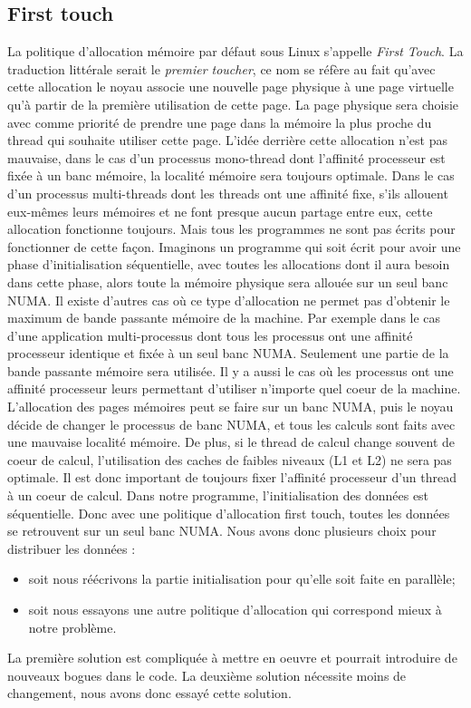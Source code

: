 \subsection{First touch}
La politique d'allocation mémoire par défaut sous Linux s'appelle {\em First Touch}.
%
La traduction littérale serait le {\em premier toucher}, ce nom se réfère au fait qu'avec cette allocation le noyau associe une nouvelle page physique à une page virtuelle qu'à partir de la première utilisation de cette page.
%
La page physique sera choisie avec comme priorité de prendre une page dans la mémoire la plus proche du thread qui souhaite utiliser cette page.
%
L'idée derrière cette allocation n'est pas mauvaise, dans le cas d'un processus mono-thread dont l'affinité processeur est fixée à un banc mémoire, la localité mémoire sera toujours optimale.
%
Dans le cas d'un processus multi-threads dont les threads ont une affinité fixe, s'ils allouent eux-mêmes leurs mémoires et ne font presque aucun partage entre eux, cette allocation fonctionne toujours.
%
Mais tous les programmes ne sont pas écrits pour fonctionner de cette façon.
%
Imaginons un programme qui soit écrit pour avoir une phase d'initialisation séquentielle, avec toutes les allocations dont il aura besoin dans cette phase, alors toute la mémoire physique sera allouée sur un seul banc NUMA.
%
Il existe d'autres cas où ce type d'allocation ne permet pas d'obtenir le maximum de bande passante mémoire de la machine.
%
Par exemple dans le cas d'une application multi-processus dont tous les processus ont une affinité processeur identique et fixée à un seul banc NUMA.
%
Seulement une partie de la bande passante mémoire sera utilisée.
%
Il y a aussi le cas où les processus ont une affinité processeur leurs permettant d'utiliser n'importe quel coeur de la machine.
%
L'allocation des pages mémoires peut se faire sur un banc NUMA, puis le noyau décide de changer le processus de banc NUMA, et tous les calculs sont faits avec une mauvaise localité mémoire.
%
De plus, si le thread de calcul change souvent de coeur de calcul, l'utilisation des caches de faibles niveaux (L1 et L2) ne sera pas optimale.
%
Il est donc important de toujours fixer l'affinité processeur d'un thread à un coeur de calcul.
%
Dans notre programme, l'initialisation des données est séquentielle. Donc avec une politique d'allocation first touch, toutes les données se retrouvent sur un seul banc NUMA.
%
Nous avons donc plusieurs choix pour distribuer les données :
\begin{itemize}
  \item soit nous réécrivons la partie initialisation pour qu'elle soit faite en parallèle;
  \item soit nous essayons une autre politique d'allocation qui correspond mieux à notre problème.
\end{itemize}
%
La première solution est compliquée à mettre en oeuvre et pourrait introduire de nouveaux bogues dans le code.
%
La deuxième solution nécessite moins de changement, nous avons donc essayé cette solution.
